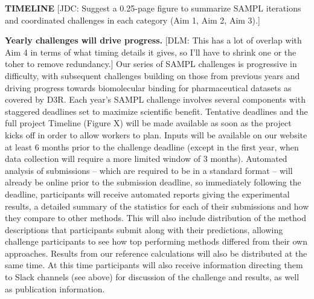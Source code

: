 \documentclass[11pt]{article}
\begin{document}

{\bf \large TIMELINE} %
{\color{red}[JDC: Suggest a 0.25-page figure to summarize SAMPL iterations and coordinated challenges in each category (Aim 1, Aim 2, Aim 3).]}


\textbf{Yearly challenges will drive progress.}
{\color{red}[DLM: This has a lot of overlap with Aim 4 in terms of what timing details it gives, so I'll have to shrink one or the toher to remove redundancy.]}
Our series of SAMPL challenges is progressive in difficulty, with subsequent challenges building on those from previous years and driving progress towards biomolecular binding for pharmaceutical datasets as covered by D3R.
Each year's SAMPL challenge involves several components with staggered deadlines set to maximize scientific benefit. 
Tentative deadlines and the full project Timeline (Figure X) will be made available as soon as the project kicks off in order to allow workers to plan.
Inputs will be available on our website at least 6 months prior to the challenge deadline (except in the first year, when data collection will require a more limited window of 3 months).
Automated analysis of submissions -- which are required to be in a standard format -- will already be online prior to the submission deadline, so immediately following the deadline, participants will receive automated reports giving the experimental results, a detailed summary of the statistics for each of their submissions and how they compare to other methods. 
This will also include distribution of the method descriptions that participants submit along with their predictions, allowing challenge participants to see how top performing methods differed from their own approaches.
Results from our reference calculations will also be distributed at the same time.
At this time participants will also receive information directing them to Slack channels (see above) for discussion of the challenge and results, as well as publication information.
\end{document}
